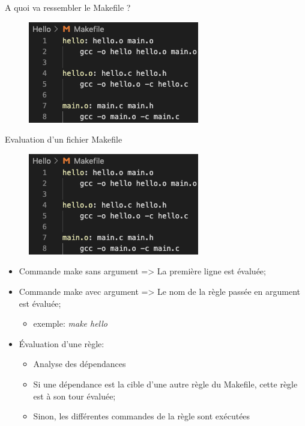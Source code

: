\documentclass[10pt,xcolor=dvipsnames]{beamer}
\newcommand{\green}[1]{\textcolor{darkspringgreen}{#1}}
\begin{document}
\begin{frame}{A quoi va ressembler le Makefile ?}
    \begin{figure}
        \centering
        \includegraphics[scale=0.8]{figures/makefile_hello.png}
        \label{fig:my_label}
    \end{figure}
\end{frame}

\begin{frame}{Evaluation d'un fichier Makefile}

\begin{minipage}[t]{0.4\textwidth}
    \begin{figure}
        \centering
        \includegraphics[scale=0.4]{figures/makefile_hello.png}
        \label{fig:my_label}
    \end{figure}
\end{minipage}
\begin{minipage}[t]{0.55\textwidth}
\begin{itemize}
    \item Commande \green{make} sans argument => La première ligne est évaluée;
    \item Commande \green{make} avec argument => Le nom de la règle passée en argument est évaluée;
    \begin{itemize}
        \item exemple: \textit{make hello}
    \end{itemize}
\item Évaluation d'une règle:
\begin{itemize}
    \item Analyse des dépendances
    \item Si une dépendance est la cible d'une autre règle du Makefile, cette règle est à son tour évaluée;
    \item Sinon, les différentes commandes de la règle sont exécutées
\end{itemize}
\end{itemize}
\end{minipage}
\end{frame}
\end{document}
